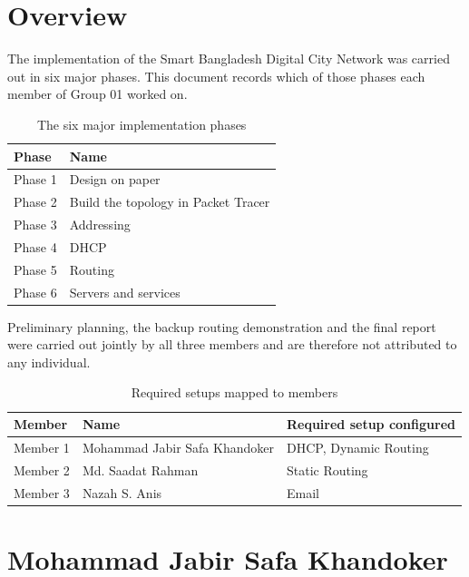 \documentclass[11pt,a4paper]{article}
\newcommand{\memA}{Mohammad Jabir Safa Khandoker}
\newcommand{\memB}{Md. Saadat Rahman}
\newcommand{\memC}{Nazah S. Anis}
\begin{document}
\setcounter{page}{1}

\section{Overview}

The implementation of the Smart Bangladesh Digital City Network was carried out in six major phases. This document records which of those phases each member of Group 01 worked on.

\begin{table}[htbp]
\centering
\caption{The six major implementation phases}
\label{tab:phases}
\begin{tabular}{@{}ll@{}}
\toprule
\textbf{Phase} & \textbf{Name} \\
\midrule
Phase 1 & Design on paper \\
Phase 2 & Build the topology in Packet Tracer \\
Phase 3 & Addressing \\
Phase 4 & DHCP \\
Phase 5 & Routing \\
Phase 6 & Servers and services \\
\bottomrule
\end{tabular}
\end{table}

\noindent
Preliminary planning, the backup routing demonstration and the final report were carried out jointly by all three members and are therefore not attributed to any individual.

\begin{table}[htbp]
\centering
\caption{Required setups mapped to members}
\label{tab:setups}
\begin{tabular}{@{}lll@{}}
\toprule
\textbf{Member} & \textbf{Name} & \textbf{Required setup configured} \\
\midrule
Member 1 & \memA & DHCP, Dynamic Routing \\
Member 2 & \memB & Static Routing \\
Member 3 & \memC & Email \\
\bottomrule
\end{tabular}
\end{table}

\section{\memA}
\end{document}
